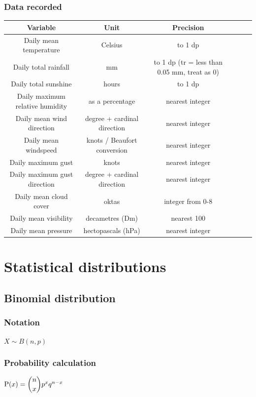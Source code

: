 \documentclass[A4paper, 11pt]{article}
\begin{document}
	\subsubsection{Data recorded}
	\begin{tabular}{|c|c|c|c|c|c|}
		\hline
		\textbf{Variable} & \textbf{Unit} & \textbf{Precision}\\
		\hline
		Daily mean temperature & Celsius & to 1 dp\\
		\hline
		Daily total rainfall & mm & to 1 dp (tr = less than 0.05 mm, treat as 0)\\
		\hline
		Daily total sunshine & hours & to 1 dp \\
		\hline
		Daily maximum relative humidity & as a percentage & nearest integer \\
		\hline
		Daily mean wind direction & degree + cardinal direction & nearest integer  \\
		\hline
		Daily mean windspeed & knots / Beaufort conversion & nearest integer \\
		\hline
		Daily maximum gust & knots & nearest integer   \\
		\hline
		Daily maximum gust direction & degree + cardinal direction & nearest integer   \\
		\hline
		Daily mean cloud cover & oktas  & integer from 0-8   \\
		\hline
		Daily mean visibility & decametres (Dm) & nearest 100  \\
		\hline
		Daily mean pressure & hectopascals (hPa) & nearest integer  \\
		\hline
	\end{tabular}
	


	
	\section{Statistical distributions}
	\subsection{Binomial distribution}
	\subsubsection{Notation}
	$X \sim B(n,p)$
	\subsubsection{Probability calculation}
	$\text{P}(x) = \dbinom{n}{x} p^x q^{n-x}$
\end{document}
